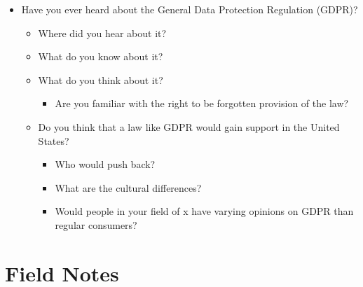 \documentclass[12pt,
 reprint,
nofootinbib,
 amsmath,amssymb,
 aps,
]{revtex4-2}
\begin{document}
\begin{itemize}
\begin{itemize}
    \end{itemize}
    \item Have you ever heard about the General Data Protection Regulation (GDPR)?
        \begin{itemize}
        \item Where did you hear about it?
        \item What do you know about it?
        \item What do you think about it?
        \begin{itemize}
            \item Are you familiar with the right to be forgotten provision of the law?
        \end{itemize}
        \item Do you think that a law like GDPR would gain support in the United States?
        \begin{itemize}
            \item Who would push back?
            \item What are the cultural differences?
            \item Would people in your field of x have varying opinions on GDPR than regular consumers?
        \end{itemize}
    \end{itemize}
\end{itemize}


\section{Field Notes}



\end{document}
